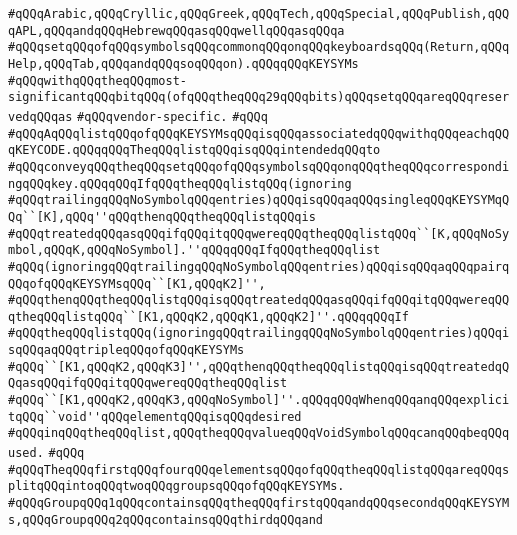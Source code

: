 \verb|#qQQqArabic,qQQqCryllic,qQQqGreek,qQQqTech,qQQqSpecial,qQQqPublish,qQQqAPL,qQQqandqQQqHebrewqQQqasqQQqwellqQQqasqQQqa|\newline
\verb|#qQQqsetqQQqofqQQqsymbolsqQQqcommonqQQqonqQQqkeyboardsqQQq(Return,qQQqHelp,qQQqTab,qQQqandqQQqsoqQQqon).qQQqqQQqKEYSYMs|\newline
\verb|#qQQqwithqQQqtheqQQqmost-significantqQQqbitqQQq(ofqQQqtheqQQq29qQQqbits)qQQqsetqQQqareqQQqreservedqQQqas|\newline
\verb|#qQQqvendor-specific.|\newline
\verb|#qQQq|\newline
\verb|#qQQqAqQQqlistqQQqofqQQqKEYSYMsqQQqisqQQqassociatedqQQqwithqQQqeachqQQqKEYCODE.qQQqqQQqTheqQQqlistqQQqisqQQqintendedqQQqto|\newline
\verb|#qQQqconveyqQQqtheqQQqsetqQQqofqQQqsymbolsqQQqonqQQqtheqQQqcorrespondingqQQqkey.qQQqqQQqIfqQQqtheqQQqlistqQQq(ignoring|\newline
\verb|#qQQqtrailingqQQqNoSymbolqQQqentries)qQQqisqQQqaqQQqsingleqQQqKEYSYMqQQq``[K],qQQq''qQQqthenqQQqtheqQQqlistqQQqis|\newline
\verb|#qQQqtreatedqQQqasqQQqifqQQqitqQQqwereqQQqtheqQQqlistqQQq``[K,qQQqNoSymbol,qQQqK,qQQqNoSymbol].''qQQqqQQqIfqQQqtheqQQqlist|\newline
\verb|#qQQq(ignoringqQQqtrailingqQQqNoSymbolqQQqentries)qQQqisqQQqaqQQqpairqQQqofqQQqKEYSYMsqQQq``[K1,qQQqK2]'',|\newline
\verb|#qQQqthenqQQqtheqQQqlistqQQqisqQQqtreatedqQQqasqQQqifqQQqitqQQqwereqQQqtheqQQqlistqQQq``[K1,qQQqK2,qQQqK1,qQQqK2]''.qQQqqQQqIf|\newline
\verb|#qQQqtheqQQqlistqQQq(ignoringqQQqtrailingqQQqNoSymbolqQQqentries)qQQqisqQQqaqQQqtripleqQQqofqQQqKEYSYMs|\newline
\verb|#qQQq``[K1,qQQqK2,qQQqK3]'',qQQqthenqQQqtheqQQqlistqQQqisqQQqtreatedqQQqasqQQqifqQQqitqQQqwereqQQqtheqQQqlist|\newline
\verb|#qQQq``[K1,qQQqK2,qQQqK3,qQQqNoSymbol]''.qQQqqQQqWhenqQQqanqQQqexplicitqQQq``void''qQQqelementqQQqisqQQqdesired|\newline
\verb|#qQQqinqQQqtheqQQqlist,qQQqtheqQQqvalueqQQqVoidSymbolqQQqcanqQQqbeqQQqused.|\newline
\verb|#qQQq|\newline
\verb|#qQQqTheqQQqfirstqQQqfourqQQqelementsqQQqofqQQqtheqQQqlistqQQqareqQQqsplitqQQqintoqQQqtwoqQQqgroupsqQQqofqQQqKEYSYMs.|\newline
\verb|#qQQqGroupqQQq1qQQqcontainsqQQqtheqQQqfirstqQQqandqQQqsecondqQQqKEYSYMs,qQQqGroupqQQq2qQQqcontainsqQQqthirdqQQqand|\newline

